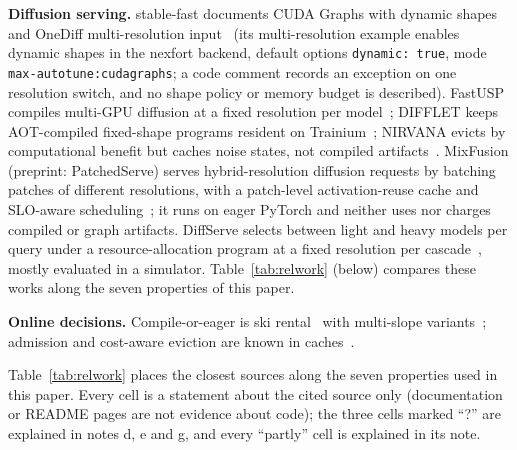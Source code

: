 \documentclass[conference]{IEEEtran}
\begin{document}
\textbf{Diffusion serving.} stable-fast documents CUDA Graphs with dynamic shapes and OneDiff multi-resolution input~\cite{stablefast,onediff} (its multi-resolution example enables dynamic shapes in the nexfort backend, default options \texttt{dynamic: true}, mode \texttt{max-autotune:cudagraphs}; a code comment records an exception on one resolution switch, and no shape policy or memory budget is described). FastUSP compiles multi-GPU diffusion at a fixed resolution per model~\cite{fastusp}; DIFFLET keeps AOT-compiled fixed-shape programs resident on Trainium~\cite{difflet}; NIRVANA evicts by computational benefit but caches noise states, not compiled artifacts~\cite{nirvana}. MixFusion (preprint: PatchedServe) serves hybrid-resolution diffusion requests by batching patches of different resolutions, with a patch-level activation-reuse cache and SLO-aware scheduling~\cite{patchedserve}; it runs on eager PyTorch and neither uses nor charges compiled or graph artifacts. DiffServe selects between light and heavy models per query under a resource-allocation program at a fixed resolution per cascade~\cite{diffserve}, mostly evaluated in a simulator. Table~\ref{tab:relwork} (below) compares these works along the seven properties of this paper.

\textbf{Online decisions.} Compile-or-eager is ski rental~\cite{karlin1988} with multi-slope variants~\cite{lotker2008}; admission and cost-aware eviction are known in caches~\cite{tinylfu,gds1997}.

Table~\ref{tab:relwork} places the closest sources along the seven properties used in this paper. Every cell is a statement about the cited source only (documentation or README pages are not evidence about code); the three cells marked ``?'' are explained in notes d, e and g, and every ``partly'' cell is explained in its note.
\end{document}
